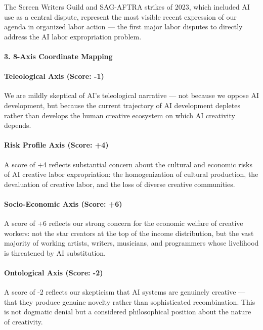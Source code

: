 The Screen Writers Guild and SAG-AFTRA strikes of 2023, which included
AI use as a central dispute, represent the most visible recent
expression of our agenda in organized labor action --- the first major
labor disputes to directly address the AI labor expropriation problem.

\paragraph{3. 8-Axis Coordinate
Mapping}\label{axis-coordinate-mapping-38}

\paragraph{Teleological Axis (Score:
-1)}\label{teleological-axis-score--1-3}

We are mildly skeptical of AI's teleological narrative --- not because
we oppose AI development, but because the current trajectory of AI
development depletes rather than develops the human creative ecosystem
on which AI creativity depends.

\paragraph{Risk Profile Axis (Score:
+4)}\label{risk-profile-axis-score-4-3}

A score of +4 reflects substantial concern about the cultural and
economic risks of AI creative labor expropriation: the homogenization of
cultural production, the devaluation of creative labor, and the loss of
diverse creative communities.

\paragraph{Socio-Economic Axis (Score:
+6)}\label{socio-economic-axis-score-6-2}

A score of +6 reflects our strong concern for the economic welfare of
creative workers: not the star creators at the top of the income
distribution, but the vast majority of working artists, writers,
musicians, and programmers whose livelihood is threatened by AI
substitution.

\paragraph{Ontological Axis (Score:
-2)}\label{ontological-axis-score--2-1}

A score of -2 reflects our skepticism that AI systems are genuinely
creative --- that they produce genuine novelty rather than sophisticated
recombination. This is not dogmatic denial but a considered
philosophical position about the nature of creativity.

